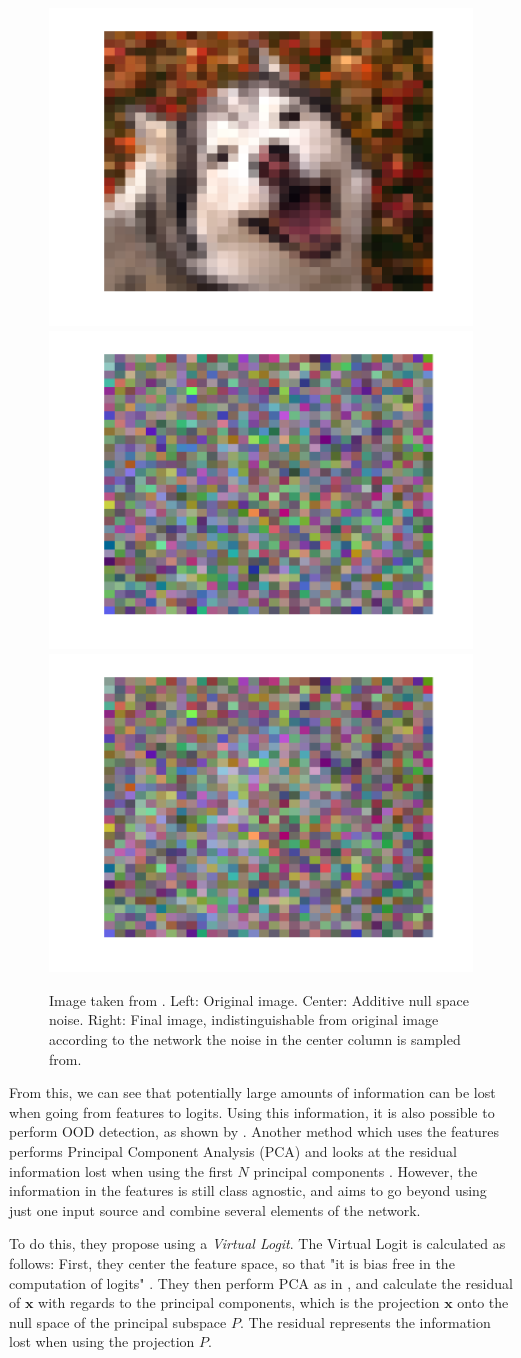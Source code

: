 \documentclass[conference]{IEEEtran}
\begin{document}
\begin{figure}[hbt]
    \centering
    \includegraphics[width=0.32\linewidth,trim={1.25cm 1.25cm 1.25cm 1.25cm},clip]{figure/OrigImage.pdf}
    \includegraphics[width=0.32\linewidth,trim={1.25cm 1.25cm 1.25cm 1.25cm},clip]{figure/PureNoise.pdf}
    \includegraphics[width=0.32\linewidth,trim={1.25cm 1.25cm 1.25cm 1.25cm},clip]{figure/NoiseAdded.pdf}
    \caption{Image taken from \cite{nusa}. Left: Original image. Center: Additive null space noise. Right: Final image, indistinguishable from original image according to the network the noise in the center column is sampled from.}
    \label{dog}
\end{figure}

From this, we can see that potentially large amounts of information can be lost when going from features to logits. Using this information, it is also possible to perform OOD detection, as shown by \cite{nusa}. Another method which uses the features performs Principal Component Analysis (PCA) and looks at the residual information lost when using the first $N$ principal components \cite{subspace}. However, the information in the features is still class agnostic, and \cite{vim} aims to go beyond using just one input source and combine several elements of the network.

To do this, they propose using a {\it Virtual Logit}. The Virtual Logit is calculated as follows: First, they center the feature space, so that "it is bias free in the computation of logits" \cite{vim}. They then perform PCA as in \cite{subspace}, and calculate the residual of $\bm{x}$ with regards to the principal components, which is the projection $\bm{x}$ onto the null space of the principal subspace $P$. The residual represents the information lost when using the projection $P$.
\end{document}
